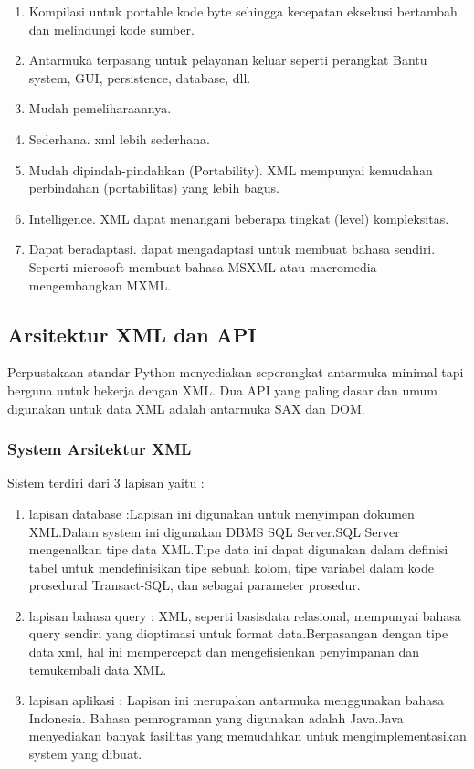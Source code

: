 \begin{enumerate}
\item Kompilasi untuk portable kode byte sehingga kecepatan eksekusi bertambah dan melindungi kode sumber.
\item Antarmuka terpasang untuk pelayanan keluar seperti perangkat Bantu system, GUI, persistence, database, dll.
\item Mudah pemeliharaannya.
\item Sederhana. xml lebih sederhana.
\item Mudah dipindah-pindahkan (Portability). XML mempunyai kemudahan perbindahan (portabilitas) yang lebih bagus.
\item Intelligence. XML dapat menangani beberapa tingkat (level) kompleksitas.
\item Dapat beradaptasi. dapat mengadaptasi untuk membuat bahasa sendiri. Seperti microsoft membuat bahasa MSXML atau macromedia mengembangkan MXML.
\end{enumerate}
 
\subsection {Arsitektur XML dan API}
  Perpustakaan standar Python menyediakan seperangkat antarmuka minimal tapi berguna untuk bekerja dengan XML. Dua API yang paling dasar dan umum digunakan untuk data XML adalah antarmuka SAX dan DOM. 
\subsubsection {System Arsitektur XML}
Sistem terdiri dari 3 lapisan yaitu :
\begin{enumerate}
\item lapisan database :Lapisan ini digunakan untuk menyimpan dokumen XML.Dalam system ini digunakan DBMS SQL Server.SQL
Server mengenalkan tipe data XML.Tipe data ini dapat digunakan dalam definisi tabel untuk mendefinisikan tipe sebuah kolom, tipe variabel dalam kode prosedural Transact-SQL, dan sebagai parameter prosedur.
\item lapisan bahasa query : XML, seperti basisdata relasional, mempunyai bahasa query sendiri yang dioptimasi untuk format data.Berpasangan dengan tipe data xml, hal ini mempercepat dan mengefisienkan penyimpanan dan temukembali data XML.
\item lapisan aplikasi : Lapisan ini merupakan antarmuka menggunakan bahasa Indonesia. Bahasa pemrograman yang digunakan adalah Java.Java menyediakan banyak fasilitas yang memudahkan untuk mengimplementasikan system yang dibuat.
\end{enumerate}


